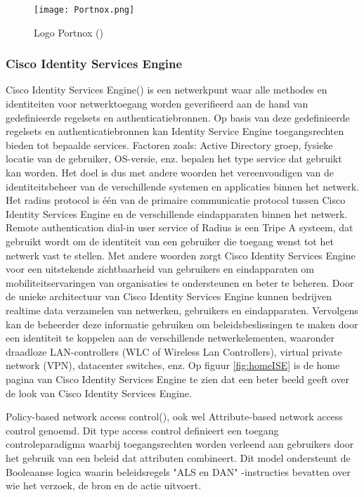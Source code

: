 \begin{figure}[H]
	\centering
	\texttt{[image: Portnox.png]}
	\caption{Logo Portnox (\cite{PortnoxLogo})}
	\label{fig:Portnox}
\end{figure}

\subsubsection{\bf Cisco Identity Services Engine}
Cisco Identity Services Engine(\cite{ISE}) is een netwerkpunt waar alle methodes en identiteiten voor netwerktoegang worden geverifieerd aan de hand van gedefinieerde regelsets en authenticatiebronnen. Op basis van deze gedefinieerde regelsets en authenticatiebronnen kan Identity Service Engine toegangsrechten bieden tot bepaalde services. Factoren zoals: Active Directory groep, fysieke locatie van de gebruiker, OS-versie, enz. bepalen het type service dat gebruikt kan worden. Het doel is dus met andere woorden het vereenvoudigen van de identiteitsbeheer van de verschillende systemen en applicaties binnen het netwerk.
\newline
\newline   
Het radius protocol is één van de primaire communicatie protocol tussen Cisco Identity Services Engine en de verschillende eindapparaten binnen het netwerk.
\newline
\newline 
Remote authentication dial-in user service of Radius is een Tripe A systeem, dat gebruikt wordt om de identiteit van een gebruiker die toegang wenst tot het netwerk vast te stellen. Met andere woorden zorgt Cisco Identity Services Engine voor een uitstekende zichtbaarheid van gebruikers en eindapparaten om mobiliteitservaringen van organisaties te ondersteunen en beter te beheren.
\newline
\newline
Door de unieke architectuur van Cisco Identity Services Engine kunnen bedrijven realtime data verzamelen van netwerken, gebruikers en eindapparaten. Vervolgens kan de beheerder deze informatie gebruiken om beleidsbeslissingen te maken door een identiteit te koppelen aan de verschillende netwerkelementen, waaronder draadloze LAN-controllers (WLC of Wireless Lan Controllers), virtual private network (VPN), datacenter switches, enz. Op figuur \ref{fig:homeISE} is de home pagina van Cisco Identity Services Engine te zien dat een beter beeld geeft over de look van Cisco Identity Services Engine.

\newpage
{}
\newline
Policy-based network access control(\cite{ABAC}), ook wel Attribute-based network access control genoemd. Dit type access control definieert een toegang controleparadigma waarbij toegangsrechten worden verleend aan gebruikers door het gebruik van een beleid dat attributen combineert. Dit model ondersteunt de Booleaanse logica waarin beleidsregels "ALS en DAN" -instructies bevatten over wie het verzoek, de bron en de actie uitvoert.

